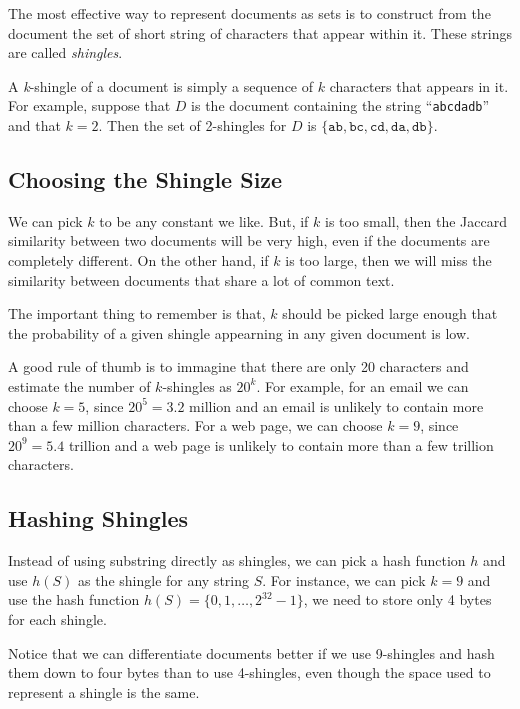 The most effective way to represent documents as sets is to construct from the document the set of short string of characters that appear within it. These strings are called \textit{shingles}. 

A \textit{k}-shingle of a document is simply a sequence of $k$ characters that appears in it. For example, suppose that $D$ is the document containing the string ``\texttt{abcdadb}'' and that $k = 2$. Then the set of 2-shingles for $D$ is $\{ \texttt{ab}, \texttt{bc}, \texttt{cd}, \texttt{da}, \texttt{db} \}$. 

\subsection{Choosing the Shingle Size}\label{subsec:choosing-the-shingle-size}

We can pick $k$ to be any constant we like. But, if $k$ is too small, then the Jaccard similarity between two documents will be very high, even if the documents are completely different. On the other hand, if $k$ is too large, then we will miss the similarity between documents that share a lot of common text.

The important thing to remember is that, $k$ should be picked large enough that the probability of a given shingle appearning in any given document is low. 

A good rule of thumb is to immagine that there are only 20 characters and estimate the number of $k$-shingles as $20^k$. For example, for an email we can choose $k = 5$, since $20^5 = 3.2$ million and an email is unlikely to contain more than a few million characters. For a web page, we can choose $k = 9$, since $20^9 = 5.4$ trillion and a web page is unlikely to contain more than a few trillion characters.

\subsection{Hashing Shingles}\label{subsec:hashing-shingles}

Instead of using substring directly as shingles, we can pick a hash function $h$ and use $h(S)$ as the shingle for any string $S$. For instance, we can pick $k = 9$ and use the hash function $h(S) = \{0, 1, \dots, 2^{32} - 1\}$, we need to store only 4 bytes for each shingle. 

Notice that we can differentiate documents better if we use 9-shingles and hash them down to four bytes than to use 4-shingles, even though the space used to represent a shingle is the same.

